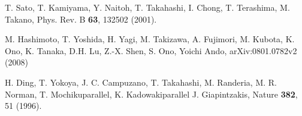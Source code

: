 \documentclass[aps,twocolumn,amsmath,amssymb,showpacs,prb,
superscriptaddress,unsortedaddress]{revtex4}
\begin{document}
\begin{thebibliography}{99}
T. Sato, T. Kamiyama, Y. Naitoh, T. Takahashi, I. Chong, T. Terashima,
M. Takano, Phys. Rev. B {\bf63}, 132502 (2001).

M. Hashimoto, T. Yoshida, H. Yagi, M. Takizawa, A. Fujimori, M.
Kubota, K. Ono, K. Tanaka, D.H. Lu, Z.-X. Shen, S. Ono, Yoichi Ando,
arXiv:0801.0782v2 (2008)

H. Ding, T. Yokoya, J. C. Campuzano, T. Takahashi, M. Randeria, M. R.
Norman, T. Mochikuparallel, K. Kadowakiparallel J. Giapintzakis,
Nature {\bf382}, 51 (1996).


\end{thebibliography}
\end{document}
